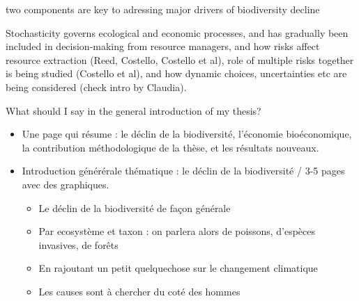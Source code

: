 two components are key to adressing major drivers of biodiversity decline



Stochasticity governs ecological and economic processes, and has gradually been included in decision-making from resource managers, and how risks affect resource extraction (Reed, Costello, Costello et al), role of multiple risks together is being studied (Costello et al), and how dynamic choices, uncertainties etc are being considered (check intro by Claudia). 
% 
\clearpage


What should I say in the general introduction of my thesis? 

\begin{itemize}
\item Une page qui résume : le déclin de la biodiversité, l'économie bioéconomique, la contribution méthodologique de la thèse, et les résultats nouveaux. 

\item Introduction générérale thématique : le déclin de la biodiversité / 3-5 pages avec des graphiques. 
\begin{itemize}
\item Le déclin de la biodiversité de façon générale
\item Par ecosystème et taxon : on parlera alors de poissons, d'espèces invasives, de forêts
\item En rajoutant un petit quelquechose sur le changement climatique
\item Les causes sont à chercher du coté des hommes
\end{itemize}


\end{itemize}
